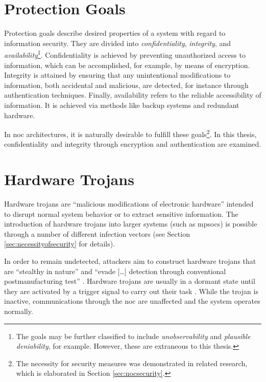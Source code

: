 \section{Protection Goals}\label{sec:protectiongoals}
Protection goals describe desired properties of a system with regard to information security. They are divided into \textit{confidentiality},
\textit{integrity}, and \textit{availability}\footnote{The goals may be further classified to include \textit{unobservability} and \textit{plausible
deniability}, for example. However, these are extraneous to this thesis.}. Confidentiality is achieved by preventing unauthorized access to information, which
can be accomplished, for example, by means of encryption. Integrity is attained by ensuring that any unintentional modifications to information, both accidental and
malicious, are detected, for instance through authentication techniques. Finally, availability refers to the reliable accessibility of information. It is
achieved via methods like backup systems and redundant hardware.

In \gls{noc} architectures, it is naturally desirable to fulfill these goals\footnote{The necessity for security measures was demonstrated in
related research, which is elaborated in Section \ref{sec:nocsecurity}.}. In this thesis, confidentiality and integrity through encryption and
authentication are examined.

\section{Hardware Trojans}\label{sec:hardwaretrojans}
Hardware trojans are \enquote{malicious modifications of electronic hardware} \cite[1]{bhunia14hardwaretrojans} intended to disrupt normal
system behavior or to extract sensitive information. The introduction of hardware trojans into larger systems (such as \glspl{mpsoc}) is possible
through a number of different infection vectors (see Section \ref{sec:necessityofsecurity} for details).

In order to remain undetected, attackers aim to construct hardware trojans that are \enquote{stealthy in nature} \cite[1]{bhunia14hardwaretrojans}
and \enquote{evade […] detection through conventional postmanufacturing test} \cite[1]{bhunia14hardwaretrojans}. Hardware trojans are usually in a
dormant state until they are activated by a trigger signal to carry out their task \cites{bhunia14hardwaretrojans}{ancajas14fortnocs}. While the
trojan is inactive, communications through the \gls{noc} are unaffected and the system operates normally.

